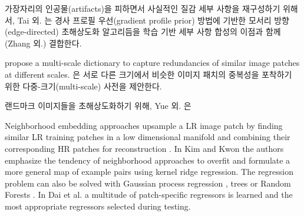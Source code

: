 \documentclass[10pt,twocolumn,letterpaper]{article}
\newcommand{\kor}[1]{#1}
\newcommand{\eng}[1]{}
\begin{document}
\eng{
To reconstruct realistic texture detail while avoiding edge artifacts, Tai et al. \cite{Tai2010} combine an edge-directed \ac{SR} algorithm based on a gradient profile prior \cite{Sun2008} with the benefits of learning-based detail synthesis. Zhang et al.
}\kor{
가장자리의 인공물(artifacts)을 피하면서 사실적인 질감 세부 사항을 재구성하기 위해서, Tai 외. \cite{Tai2010}는 경사 프로필 우선(gradient profile prior) \cite{Sun2008} 방법에 기반한 모서리 방향(edge-directed) \ac{초해상도화} 알고리듬을 학습 기반 세부 사항 합성의 이점과 함께 (Zhang 외.) 결합한다.
} \eng{
\cite{zhang2012multi} propose a multi-scale dictionary to capture redundancies of similar image patches at different scales.
}\kor{
\cite{zhang2012multi} propose a multi-scale dictionary to capture redundancies of similar image patches at different scales.
\cite{zhang2012multi}은 서로 다른 크기에서 비슷한 이미지 패치의 중복성을 포착하기 위한 다중-크기(multi-scale) 사전을 제안한다.
} %
\eng{
To super-resolve landmark images, Yue et al. \cite{Yue2013} retrieve correlating \ac{HR} images with similar content from the web and propose a structure-aware matching criterion for alignment.
}\kor{
랜드마크 이미지들을 초해상도화하기 위해, Yue 외. \cite{Yue2013}은
}

Neighborhood embedding approaches upsample a \ac{LR} image patch by finding similar \ac{LR} training patches in a low dimensional manifold and combining their corresponding \ac{HR} patches for reconstruction \cite{timofte2013anchored,timofte2014a+}.
In Kim and Kwon \cite{Kim10kernelregression} the authors emphasize the tendency of neighborhood approaches to overfit and formulate a more general map of example pairs using kernel ridge regression.
The regression problem can also be solved with Gaussian process regression \cite{he2011single}, trees \cite{salvador2015naive} or Random Forests \cite{schulter2015fast}.
In Dai et al. \cite{dai2015jointly} a multitude of patch-specific regressors is learned and the most appropriate regressors selected during testing. %
\end{document}
